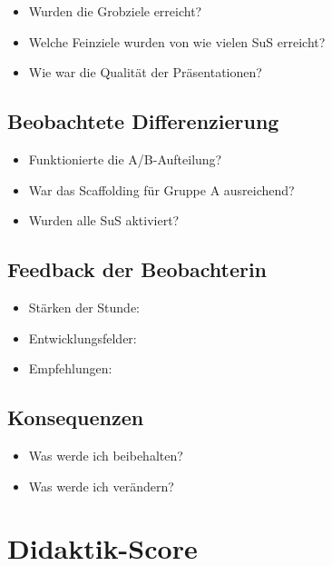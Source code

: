 \documentclass[11pt, a4paper]{article}
\begin{document}
\begin{itemize}[leftmargin=2em]
    \item Wurden die Grobziele erreicht?
    \item Welche Feinziele wurden von wie vielen SuS erreicht?
    \item Wie war die Qualität der Präsentationen?
\end{itemize}

\subsection{Beobachtete Differenzierung}

\begin{itemize}[leftmargin=2em]
    \item Funktionierte die A/B-Aufteilung?
    \item War das Scaffolding für Gruppe A ausreichend?
    \item Wurden alle SuS aktiviert?
\end{itemize}

\subsection{Feedback der Beobachterin}

\begin{itemize}[leftmargin=2em]
    \item Stärken der Stunde:
    \item Entwicklungsfelder:
    \item Empfehlungen:
\end{itemize}

\subsection{Konsequenzen}

\begin{itemize}[leftmargin=2em]
    \item Was werde ich beibehalten?
    \item Was werde ich verändern?
\end{itemize}


\newpage
\section{Didaktik-Score}
\end{document}
